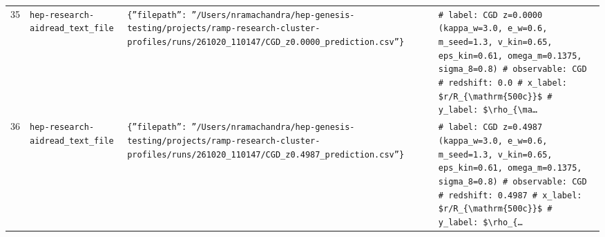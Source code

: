 \documentclass[11pt,a4paper]{article}
\begin{document}
\begin{longtable}{@{}p{}p{}p{}p{}@{}}
35 & \texttt{hep-research-aid}\newline\texttt{read\_\allowbreak{}text\_\allowbreak{}file} & \texttt{\{''filepath'':\allowbreak{} ''/\allowbreak{}Users/\allowbreak{}nramachandra/\allowbreak{}hep-genesis-testing/\allowbreak{}projects/\allowbreak{}ramp-research-cluster-profiles/\allowbreak{}runs/\allowbreak{}261020\_\allowbreak{}110147/\allowbreak{}CGD\_\allowbreak{}z0.0000\_\allowbreak{}prediction.csv''\}\allowbreak{}} & \texttt{\# label:\allowbreak{} CGD z=\allowbreak{}0.0000 (kappa\_\allowbreak{}w=\allowbreak{}3.0,\allowbreak{} e\_\allowbreak{}w=\allowbreak{}0.6,\allowbreak{} m\_\allowbreak{}seed=\allowbreak{}1.3,\allowbreak{} v\_\allowbreak{}kin=\allowbreak{}0.65,\allowbreak{} eps\_\allowbreak{}kin=\allowbreak{}0.61,\allowbreak{} omega\_\allowbreak{}m=\allowbreak{}0.1375,\allowbreak{} sigma\_\allowbreak{}8=\allowbreak{}0.8)\allowbreak{} \# observable:\allowbreak{} CGD \# redshift:\allowbreak{} 0.0 \# x\_\allowbreak{}label:\allowbreak{} \$r/\allowbreak{}R\_\allowbreak{}\{\textbackslash{}\allowbreak{}mathrm\{500c\}\allowbreak{}\}\allowbreak{}\$ \# y\_\allowbreak{}label:\allowbreak{} \$\textbackslash{}\allowbreak{}rho\_\allowbreak{}\{\textbackslash{}\allowbreak{}ma\ldots{}\allowbreak{}} \\
36 & \texttt{hep-research-aid}\newline\texttt{read\_\allowbreak{}text\_\allowbreak{}file} & \texttt{\{''filepath'':\allowbreak{} ''/\allowbreak{}Users/\allowbreak{}nramachandra/\allowbreak{}hep-genesis-testing/\allowbreak{}projects/\allowbreak{}ramp-research-cluster-profiles/\allowbreak{}runs/\allowbreak{}261020\_\allowbreak{}110147/\allowbreak{}CGD\_\allowbreak{}z0.4987\_\allowbreak{}prediction.csv''\}\allowbreak{}} & \texttt{\# label:\allowbreak{} CGD z=\allowbreak{}0.4987 (kappa\_\allowbreak{}w=\allowbreak{}3.0,\allowbreak{} e\_\allowbreak{}w=\allowbreak{}0.6,\allowbreak{} m\_\allowbreak{}seed=\allowbreak{}1.3,\allowbreak{} v\_\allowbreak{}kin=\allowbreak{}0.65,\allowbreak{} eps\_\allowbreak{}kin=\allowbreak{}0.61,\allowbreak{} omega\_\allowbreak{}m=\allowbreak{}0.1375,\allowbreak{} sigma\_\allowbreak{}8=\allowbreak{}0.8)\allowbreak{} \# observable:\allowbreak{} CGD \# redshift:\allowbreak{} 0.4987 \# x\_\allowbreak{}label:\allowbreak{} \$r/\allowbreak{}R\_\allowbreak{}\{\textbackslash{}\allowbreak{}mathrm\{500c\}\allowbreak{}\}\allowbreak{}\$ \# y\_\allowbreak{}label:\allowbreak{} \$\textbackslash{}\allowbreak{}rho\_\allowbreak{}\{\ldots{}\allowbreak{}} \\

\end{longtable}
\end{document}
